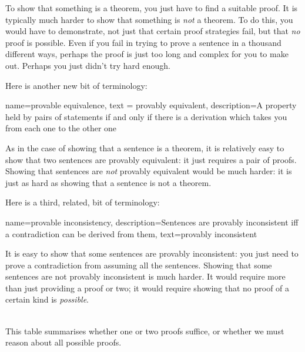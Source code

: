 To show that something is a theorem, you just have to find a suitable proof. It is typically much harder to show that something is \emph{not} a theorem. To do this, you would have to demonstrate, not just that certain proof strategies fail, but that \emph{no} proof is possible. Even if you fail in trying to prove a sentence in a thousand different ways, perhaps the proof is just too long and complex for you to make out. Perhaps you just didn't try hard enough.

Here is another new bit of terminology:
        
{
  name=provable equivalence,
  text = provably equivalent,
description={A property held by pairs of statements if and only if there is a derivation which takes you from each one to the other one}
}


As in the case of showing that a sentence is a theorem, it is relatively easy to show that two sentences are provably equivalent: it just requires a pair of proofs. Showing that sentences are \emph{not} provably equivalent would be much harder: it is just as hard as showing that a sentence is not a theorem. 

Here is a third, related, bit of terminology:
        
{    name={provable inconsistency}, 
  description={Sentences are provably inconsistent iff a contradiction can be derived from them},
    text={provably inconsistent}
}

        It is easy to show that some sentences are provably inconsistent: you just need to prove a contradiction from assuming all the sentences. Showing that some sentences are not provably inconsistent is much harder. It would require more than just providing a proof or two; it would require showing that no proof of a certain kind is \emph{possible}.

\
\\
This table summarises whether one or two proofs suffice, or whether we must reason about all possible proofs.

